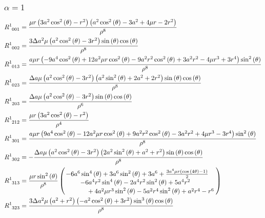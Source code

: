 \documentclass[11pt,a4paper]{article}
\begin{document}
\subsubsection*{$\alpha = 1$}
\begin{align}
R^1_{\phantom{1} 0 0 1} &=\frac{\mu r \left(3 a^{2} \cos^{2}{\left(\theta \right)} - r^{2}\right) \left(a^{2} \cos^{2}{\left(\theta \right)} - 3 a^{2} + 4 \mu r - 2 r^{2}\right)}{\rho^{8}}\\
R^1_{\phantom{1} 0 0 2} &=\frac{3 \Delta a^{2} \mu \left(a^{2} \cos^{2}{\left(\theta \right)} - 3 r^{2}\right) \sin{\left(\theta \right)} \cos{\left(\theta \right)}}{\rho^{8}}\\
R^1_{\phantom{1} 0 1 3} &=\frac{a \mu r \left(- 9 a^{4} \cos^{2}{\left(\theta \right)} + 12 a^{2} \mu r \cos^{2}{\left(\theta \right)} - 9 a^{2} r^{2} \cos^{2}{\left(\theta \right)} + 3 a^{2} r^{2} - 4 \mu r^{3} + 3 r^{4}\right) \sin^{2}{\left(\theta \right)}}{\rho^{8}}\\
R^1_{\phantom{1} 0 2 3} &=\frac{\Delta a \mu \left(a^{2} \cos^{2}{\left(\theta \right)} - 3 r^{2}\right) \left(a^{2} \sin^{2}{\left(\theta \right)} + 2 a^{2} + 2 r^{2}\right) \sin{\left(\theta \right)} \cos{\left(\theta \right)}}{\rho^{8}}\\
R^1_{\phantom{1} 2 0 3} &=\frac{\Delta a \mu \left(a^{2} \cos^{2}{\left(\theta \right)} - 3 r^{2}\right) \sin{\left(\theta \right)} \cos{\left(\theta \right)}}{\rho^{6}}\\
R^1_{\phantom{1} 2 1 2} &=\frac{\mu r \left(3 a^{2} \cos^{2}{\left(\theta \right)} - r^{2}\right)}{\rho^{4}}\\
R^1_{\phantom{1} 3 0 1} &=\frac{a \mu r \left(9 a^{4} \cos^{2}{\left(\theta \right)} - 12 a^{2} \mu r \cos^{2}{\left(\theta \right)} + 9 a^{2} r^{2} \cos^{2}{\left(\theta \right)} - 3 a^{2} r^{2} + 4 \mu r^{3} - 3 r^{4}\right) \sin^{2}{\left(\theta \right)}}{\rho^{8}}\\
R^1_{\phantom{1} 3 0 2} &=- \frac{\Delta a \mu \left(a^{2} \cos^{2}{\left(\theta \right)} - 3 r^{2}\right) \left(2 a^{2} \sin^{2}{\left(\theta \right)} + a^{2} + r^{2}\right) \sin{\left(\theta \right)} \cos{\left(\theta \right)}}{\rho^{8}}\\
R^1_{\phantom{1} 3 1 3} &=\frac{\mu r \sin^{2}{\left(\theta \right)}}{\rho^{8}} \left( \splitfrac{- 6 a^{6} \sin^{4}{\left(\theta \right)} + 3 a^{6} \sin^{2}{\left(\theta \right)} + 3 a^{6} + \frac{3 a^{4} \mu r \left(\cos{\left(4 \theta \right)} - 1\right)}{2}}{\splitdfrac{- 6 a^{4} r^{2} \sin^{4}{\left(\theta \right)} - 2 a^{4} r^{2} \sin^{2}{\left(\theta \right)} + 5 a^{4} r^{2} }{+ 4 a^{2} \mu r^{3} \sin^{2}{\left(\theta \right)} - 5 a^{2} r^{4} \sin^{2}{\left(\theta \right)} + a^{2} r^{4} - r^{6}} } \right)\\
R^1_{\phantom{1} 3 2 3} &=\frac{3 \Delta a^{2} \mu \left(a^{2} + r^{2}\right) \left(- a^{2} \cos^{2}{\left(\theta \right)} + 3 r^{2}\right) \sin^{3}{\left(\theta \right)} \cos{\left(\theta \right)}}{\rho^{8}}\\
\end{align}
\end{document}
